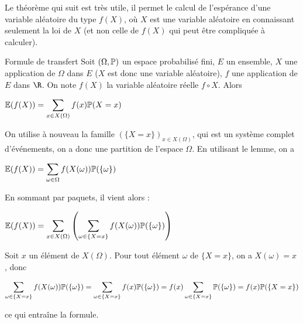 \documentclass[12pt,a4paper]{report}
\begin{document}
Le théorème qui suit est très utile, il permet le calcul de l'espérance d'une variable aléatoire du type $f(X)$, où $X$ est une variable aléatoire en connaissant seulement la loi de $X$ (et non celle de $f(X)$ qui peut être compliquée à calculer).

\pagebreak

\begin{theoreme}{Formule de transfert}{}
Soit $(\Omega, \mathbb{P})$ un espace probabilisé fini, $E$ un ensemble, $X$ une application de $\Omega$ dans $E$ ($X$ est donc une variable aléatoire), $f$ une application de $E$ dans $\R$. On note $f(X)$ la variable aléatoire réelle $f\circ X$. Alors 
\begin{center}
$\mathbb{E}(f(X)) = \displaystyle \sum_{x \in X(\Omega)} f(x) \mathbb{P}(X=x)$
\end{center}
\end{theoreme}

\begin{demo}{}
On utilise à nouveau la famille $(\{X = x\})_{x \in X(\Omega)}$, qui est un système complet d'événements, on a donc une partition de l'espace $\Omega$. En utilisant le lemme, on a 
\begin{center}
$\mathbb{E}(f(X)) = \displaystyle \sum_{\omega \in \Omega} f(X(\omega)) \mathbb{P}(\{\omega\})$
\end{center}

En sommant par paquets, il vient alors :
\begin{center}
$\mathbb{E}(f(X)) = \displaystyle \sum_{x \in X(\Omega)} \left(\sum_{\omega \in \{X = x\}} f(X(\omega)) \mathbb{P}(\{\omega\})\right)$
\end{center}

Soit $x$ un élément de $X(\Omega)$. Pour tout élément $\omega$ de $\{X=x\}$, on a $X(\omega) = x$ \footnotemark, donc
\begin{center}
$\displaystyle \sum_{\omega \in \{X=x\}} f(X(\omega))\mathbb{P}(\{\omega\}) = \sum_{\omega \in \{X=x\}} f(x) \mathbb{P}(\{\omega\}) = f(x) \sum_{\omega \in \{X=x\}} \mathbb{P}(\{\omega\}) = f(x) \mathbb{P}(\{X=x\})$
\end{center}
ce qui entraîne la formule.
\end{demo}

\end{document}
